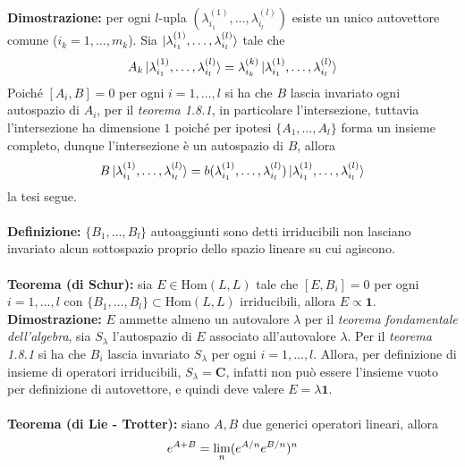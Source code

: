 \documentclass{article}
\begin{document}
\textbf{Dimostrazione:} per ogni $l$-upla $(\lambda^{(1)}_{i_1}, \dots, \lambda^{(l)}_{i_l})$ esiste un unico autovettore comune ($i_k = 1, \dots, m_k$). Sia $\ket{\lambda^{(1)}_{i_1}, \dots, \lambda^{(l)}_{i_l}}$ tale che
\begin{gather}
    A_k\ket{\lambda^{(1)}_{i_1}, \dots, \lambda^{(l)}_{i_l}} = \lambda^{(k)}_{i_k}\ket{\lambda^{(1)}_{i_1}, \dots, \lambda^{(l)}_{i_l}} \notag
\end{gather}
Poiché $[A_i, B] = 0$ per ogni $i = 1, \dots, l$ si ha che $B$ lascia invariato ogni autospazio di $A_i$, per il \textit{teorema 1.8.1}, in particolare l'intersezione, tuttavia l'intersezione ha dimensione $1$ poiché per ipotesi $\{A_1, \dots, A_l\}$ forma un insieme completo, dunque l'intersezione è un autospazio di $B$, allora
\begin{gather}
    B\ket{\lambda^{(1)}_{i_1}, \dots, \lambda^{(l)}_{i_l}} = b(\lambda^{(1)}_{i_1}, \dots, \lambda^{(l)}_{i_l})\ket{\lambda^{(1)}_{i_1}, \dots, \lambda^{(l)}_{i_l}} \notag
\end{gather}
la tesi segue. \\ \\
\textbf{Definizione:} $\{B_1, \dots, B_l\}$ autoaggiunti sono detti irriducibili non lasciano invariato alcun sottospazio proprio dello spazio lineare su cui agiscono. \\ \\
\textbf{Teorema (di Schur):} sia $E \in \mathrm{Hom}(L, L)$ tale che $[E, B_i] = 0$ per ogni $i = 1, \dots, l$ con $\{B_1, \dots, B_l\} \subset \mathrm{Hom}(L, L)$ irriducibili, allora $E \propto \mathbf{1}$. \\

\textbf{Dimostrazione:} $E$ ammette almeno un autovalore $\lambda$ per il \textit{teorema fondamentale dell'algebra}, sia $S_\lambda$ l'autospazio di $E$ associato all'autovalore $\lambda$. Per il \textit{teorema 1.8.1} si ha che $B_i$ lascia invariato $S_\lambda$ per ogni $i = 1, \dots, l$. Allora, per definizione di insieme di operatori irriducibili, $S_\lambda = \mathbf{C}$, infatti non può essere l'insieme vuoto per definizione di autovettore, e quindi deve valere $E = \lambda\mathbf{1}$. \\ \\
\textbf{Teorema (di Lie - Trotter):} siano $A, B$ due generici operatori lineari, allora
\begin{gather}
    e^{A + B} = \lim_n (e^{A/n}e^{B/n})^n \notag
\end{gather}
\end{document}
